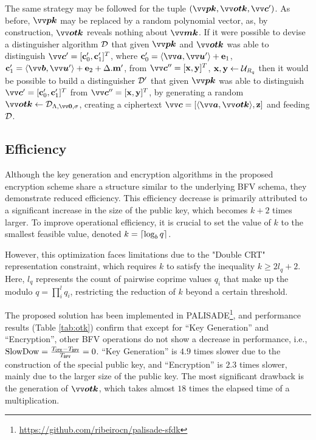 The same strategy may be followed for the tuple $(\pv{pk},\pv{otk},\pv{c}')$. As before, $\pv{pk}$ may be replaced by a random polynomial vector, as, by construction, $\pv{otk}$ reveals nothing about $\pv{mk}$\cite{micciancioTrapdoorsLatticesSimpler2012}. If it were possible to devise a distinguisher algorithm $\mathcal{D}$ that given $\pv{pk}$ and $\pv{otk}$ was able to distinguish $\pv{c}'=[\pc'_0, \pc'_1]^T$, where $\pc'_0 = \inprod{\pv{a}}{\pv{u}'} + \pe_1$, $\pc'_1 = \inprod{\pv{b}}{\pv{u}'} + \pe_2 + \Delta.\ppm'$, from $\pv{c}''=[\px, \py]^T$, $\mathbf{x},\mathbf{y} \leftarrow \mathcal{U}_{\mathit{R}_q}$ then it would be possible to build a distinguisher $\mathcal{D}'$ that given $\pv{pk}$ was able to distinguish $\pv{c}'=[\pc'_0, \pc'_1]^T$ from $\pv{c}''=[\px, \py]^T$, by generating a random $\pv{otk} \from \D_{\Lambda,\pv{0},\sigma}$, creating a ciphertext $\pv{c}=[\inprod{\pv{a}}{\pv{otk}},\pz]$ and feeding $\mathcal{D}$.

\subsection{Efficiency}

Although the key generation and encryption algorithms in the proposed encryption scheme share a structure similar to the underlying BFV schema, they demonstrate reduced efficiency. This efficiency decrease is primarily attributed to a significant increase in the size of the public key, which becomes $k + 2$ times larger. To improve operational efficiency, it is crucial to set the value of $k$ to the smallest feasible value, denoted $k = \left\lceil \log_b q \right\rceil$.

However, this optimization faces limitations due to the "Double CRT" representation constraint, which requires $k$ to satisfy the inequality $k \ge 2l_q+2$. Here, $l_q$ represents the count of pairwise coprime values $q_i$ that make up the modulo $q=\prod_i^l q_i$, restricting the reduction of $k$ beyond a certain threshold.

The proposed solution has been implemented in PALISADE\footnote{\url{https://github.com/ribeirocn/palisade-sfdk}}, and performance results (Table \ref{tab:otk}) confirm that except for ``Key Generation'' and ``Encryption'', other BFV operations do not show a decrease in performance, i.e., $\textrm{SlowDow}=\frac{T_{\mathtt{OTK}} - T_{\mathtt{BFV}}}{T_{\mathtt{BFV}}} = 0$. ``Key Generation'' is $4.9$ times slower due to the construction of the special public key, and ``Encryption'' is $2.3$ times slower, mainly due to the larger size of the public key. The most significant drawback is the generation of $\pv{otk}$, which takes almost $18$ times the elapsed time of a multiplication.



